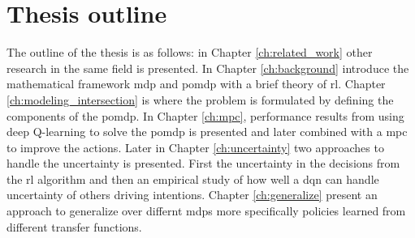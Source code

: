 \section{Thesis outline}
The outline of the thesis is as follows: in Chapter \ref{ch:related_work} other research in the same field is presented. In Chapter \ref{ch:background} introduce the mathematical framework \gls{mdp} and \gls{pomdp} with a brief theory of \gls{rl}. 
Chapter \ref{ch:modeling_intersection} is where the problem is formulated by defining the components of the \gls{pomdp}. In Chapter \ref{ch:mpc}, performance results from using deep Q-learning to solve the \gls{pomdp} is presented and later combined with a \gls{mpc} to improve the actions. Later in Chapter \ref{ch:uncertainty} two approaches to handle the uncertainty is presented. First the uncertainty in the decisions from the \gls{rl} algorithm and then an empirical study of how well a \gls{dqn} can handle uncertainty of others driving intentions. Chapter \ref{ch:generalize} present an approach to generalize over differnt \gls{mdp}s more specifically policies learned from different transfer functions. 


